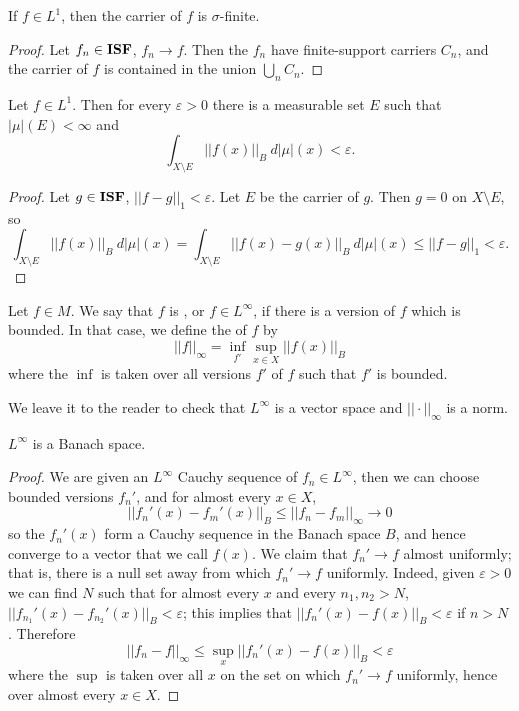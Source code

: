 \begin{lemma}
If $f \in L^1$, then the carrier of $f$ is $\sigma$-finite.
\end{lemma}
\begin{proof}
Let $f_n \in \mathbf{ISF}$, $f_n \to f$. Then the $f_n$ have finite-support carriers $C_n$, and the carrier of $f$ is contained in the union $\bigcup_n C_n$.
\end{proof}

\begin{lemma}
\label{L1 functions almost have finite carrier}
Let $f \in L^1$. Then for every $\varepsilon > 0$ there is a measurable set $E$ such that $|\mu|(E) < \infty$ and
$$\int_{X \setminus E} ||f(x)||_B ~d|\mu|(x) < \varepsilon.$$
\end{lemma}
\begin{proof}
Let $g \in \mathbf{ISF}$, $||f - g||_1 < \varepsilon$.
Let $E$ be the carrier of $g$. Then $g = 0$ on $X \setminus E$, so
$$\int_{X \setminus E} ||f(x)||_B ~d|\mu|(x) = \int_{X \setminus E} ||f(x) - g(x)||_B ~d|\mu|(x) \leq ||f - g||_1 < \varepsilon.$$
\end{proof}

\begin{definition}
Let $f \in M$. We say that $f$ is , or $f \in L^\infty$, if there is a version of $f$ which is bounded.
In that case, we define the  of $f$ by
$$||f||_\infty = \inf_{f'} \sup_{x \in X} ||f(x)||_B$$
where the $\inf$ is taken over all versions $f'$ of $f$ such that $f'$ is bounded.
\end{definition}

\begin{subsec}
We leave it to the reader to check that $L^\infty$ is a vector space and $||\cdot||_\infty$ is a norm.
\end{subsec}

\begin{lemma}
$L^\infty$ is a Banach space.
\end{lemma}
\begin{proof}
We are given an $L^\infty$ Cauchy sequence of $f_n \in L^\infty$, then we can choose bounded versions $f_n'$, and for almost every $x \in X$,
$$||f_n'(x) - f_m'(x)||_B \leq ||f_n - f_m||_\infty \to 0$$
so the $f_n'(x)$ form a Cauchy sequence in the Banach space $B$, and hence converge to a vector that we call $f(x)$.
We claim that $f_n' \to f$ almost uniformly; that is, there is a null set away from which $f_n' \to f$ uniformly.
Indeed, given $\varepsilon > 0$ we can find $N$ such that for almost every $x$ and every $n_1, n_2 > N$, $||f_{n_1}'(x) - f_{n_2}'(x)||_B < \varepsilon$; this implies that $||f_n'(x) - f(x)||_B < \varepsilon$ if $n > N$.
Therefore
$$||f_n - f||_\infty \leq \sup_x ||f_n'(x) - f(x)||_B < \varepsilon$$
where the $\sup$ is taken over all $x$ on the set on which $f_n' \to f$ uniformly, hence over almost every $x \in X$.
\end{proof}

